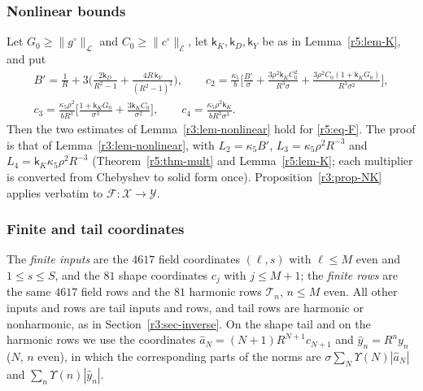 \documentclass[11pt]{amsart}
\theoremstyle{definition}
\theoremstyle{remark}
\numberwithin{equation}{section}
\newcommand{\Fc}{\mathcal{F}}
\newcommand{\nrm}[1]{\lVert #1\rVert}
\begin{document}
\subsubsection*{Nonlinear bounds}
Let $G_0\geq\nrm{g^\circ}_{\mathcal L}$ and $C_0\geq\nrm{c^\circ}_{\mathcal E}$, let $\mathsf k_K,\mathsf k_D,\mathsf k_Y$ be as in Lemma~\ref{r5:lem-K}, and put
\begin{gather*}
B'=\frac1R+3\Big(\frac{2\mathsf k_D}{R^2-1}+\frac{4R\,\mathsf k_Y}{(R^2-1)^2}\Big),\qquad c_2=\frac{\kappa_5}b\Big[\frac{B'}\sigma+\frac{3\rho^2\mathsf k_KC_0^2}{R^3\sigma}+\frac{3\rho^2C_0(1+\mathsf k_KG_0)}{R^3\sigma^2}\Big],\\
c_3=\frac{\kappa_5\rho^2}{bR^3}\Big[\frac{1+\mathsf k_KG_0}{\sigma^3}+\frac{3\mathsf k_KC_0}{\sigma^2}\Big],\qquad c_4=\frac{\kappa_5\rho^2\mathsf k_K}{bR^3\sigma^3}.
\end{gather*}
Then the two estimates of Lemma~\ref{r3:lem-nonlinear} hold for \eqref{r5:eq-F}. The proof is that of Lemma~\ref{r3:lem-nonlinear}, with $L_2=\kappa_5B'$, $L_3=\kappa_5\rho^2R^{-3}$ and $L_4=\mathsf k_K\kappa_5\rho^2R^{-3}$ (Theorem~\ref{r5:thm-mult} and Lemma~\ref{r5:lem-K}; each multiplier is converted from Chebyshev to solid form once). Proposition~\ref{r3:prop-NK} applies verbatim to $\Fc\colon\mathcal X\to\mathcal Y$.

\subsubsection*{Finite and tail coordinates}
The \emph{finite inputs} are the $4617$ field coordinates $(\ell,s)$ with $\ell\leq M$ even and $1\leq s\leq S$, and the $81$ shape coordinates $c_j$ with $j\leq M+1$; the \emph{finite rows} are the same $4617$ field rows and the $81$ harmonic rows $\mathcal T_n$, $n\leq M$ even. All other inputs and rows are tail inputs and rows, and tail rows are harmonic or nonharmonic, as in Section~\ref{r3:sec-inverse}. On the shape tail and on the harmonic rows we use the coordinates $\hat a_N=(N+1)R^{N+1}c_{N+1}$ and $\hat y_n=R^ny_n$ ($N$, $n$ even), in which the corresponding parts of the norms are $\sigma\sum_N\Upsilon(N)|\hat a_N|$ and $\sum_n\Upsilon(n)|\hat y_n|$.
\end{document}
